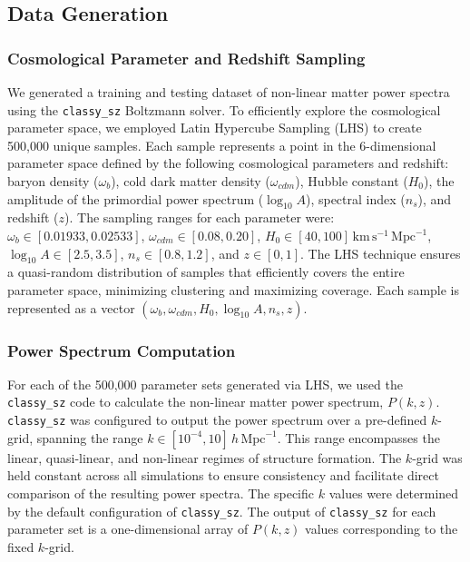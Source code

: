 \documentclass[twocolumn]{aastex631}
\begin{document}
\subsection{Data Generation}

\subsubsection{Cosmological Parameter and Redshift Sampling}

We generated a training and testing dataset of non-linear matter power spectra using the \texttt{classy\_sz} Boltzmann solver. To efficiently explore the cosmological parameter space, we employed Latin Hypercube Sampling (LHS) to create 500,000 unique samples. Each sample represents a point in the 6-dimensional parameter space defined by the following cosmological parameters and redshift: baryon density ($\omega_b$), cold dark matter density ($\omega_{cdm}$), Hubble constant ($H_0$), the amplitude of the primordial power spectrum ($\log_{10} A$), spectral index ($n_s$), and redshift ($z$). The sampling ranges for each parameter were: $\omega_b \in [0.01933, 0.02533]$, $\omega_{cdm} \in [0.08, 0.20]$, $H_0 \in [40, 100]\,\mathrm{km}\,\mathrm{s}^{-1}\,\mathrm{Mpc}^{-1}$, $\log_{10} A \in [2.5, 3.5]$, $n_s \in [0.8, 1.2]$, and $z \in [0, 1]$. The LHS technique ensures a quasi-random distribution of samples that efficiently covers the entire parameter space, minimizing clustering and maximizing coverage. Each sample is represented as a vector $(\omega_b, \omega_{cdm}, H_0, \log_{10} A, n_s, z)$.

\subsubsection{Power Spectrum Computation}

For each of the 500,000 parameter sets generated via LHS, we used the \texttt{classy\_sz} code to calculate the non-linear matter power spectrum, $P(k, z)$. \texttt{classy\_sz} was configured to output the power spectrum over a pre-defined $k$-grid, spanning the range $k \in [10^{-4}, 10]\,h\,\mathrm{Mpc}^{-1}$. This range encompasses the linear, quasi-linear, and non-linear regimes of structure formation. The $k$-grid was held constant across all simulations to ensure consistency and facilitate direct comparison of the resulting power spectra. The specific $k$ values were determined by the default configuration of \texttt{classy\_sz}. The output of \texttt{classy\_sz} for each parameter set is a one-dimensional array of $P(k, z)$ values corresponding to the fixed $k$-grid.
\end{document}
